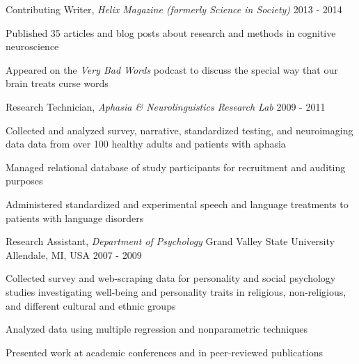 \begin{cventries}
   \cventry
    {Contributing Writer, \textit{Helix Magazine (formerly Science in Society)}}
    {}
    {}
    {2013 - 2014}
    {
    \begin{cvitems}
    \item {Published 35 articles and blog posts about research and methods in cognitive neuroscience}
    \item {Appeared on the \textit{Very Bad Words} podcast to discuss the special way that our brain treats curse words}
    \end{cvitems}
    }

  \cventry
    {Research Technician, \textit{Aphasia \& Neurolinguistics Research Lab}} %
    {} %
    {} %
    {2009 - 2011} %
    {
      \begin{cvitems} %
        \item {Collected and analyzed survey, narrative, standardized testing, and neuroimaging data data from over 100 healthy adults and patients with aphasia}
        \item {Managed relational database of study participants for recruitment and auditing purposes}
        \item {Administered standardized and experimental speech and language treatments to patients with language disorders}
      \end{cvitems}
    }

  \cventry
    {Research Assistant, \textit{Department of Psychology}} %
    {Grand Valley State University} %
    {Allendale, MI, USA} %
    {2007 - 2009} %
    {
      \begin{cvitems} %
        \item {Collected survey and web-scraping data for personality and social psychology studies investigating well-being and personality traits in religious, non-religious, and different cultural and ethnic groups}
        \item {Analyzed data using multiple regression and nonparametric techniques}
        \item {Presented work at academic conferences and in peer-reviewed publications}
      \end{cvitems}
    }

\end{cventries}
